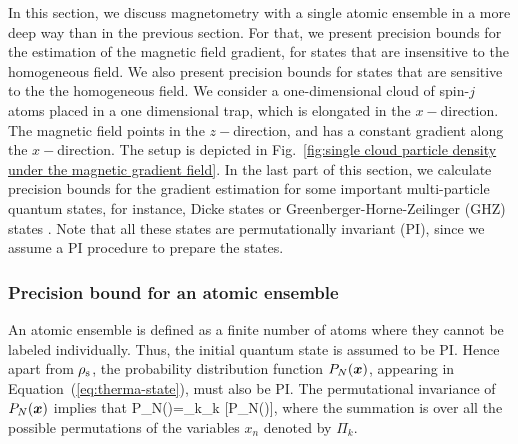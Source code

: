 In this section, we discuss magnetometry with a single
atomic ensemble in a more deep way than in the previous section.
For that, we present precision bounds for
the estimation of the magnetic field gradient, for
states that are insensitive to the homogeneous field.
We also present precision bounds for states that are sensitive to the
the homogeneous field.
We consider a one-dimensional cloud of spin-$j$ atoms
placed in a one dimensional trap, which is elongated
in the  $x-$direction.
The magnetic field points in the  $z-$direction,
and has a constant gradient along the $x-$direction.
The setup is depicted
in Fig.~\ref{fig:single cloud particle density under the magnetic gradient field}.
In the last part of this section, we calculate precision bounds for the
gradient estimation for some important multi-particle quantum states,
for instance, Dicke states or
Greenberger-Horne-Zeilinger (GHZ) states \cite{Greenberger1990}.
Note that all these states are permutationally invariant (PI), since we
assume a PI procedure to prepare the states.

\subsubsection{Precision bound for an atomic ensemble}

An atomic ensemble is defined as a finite number of atoms where
they cannot be labeled individually.
Thus, the initial quantum state is assumed to be PI.
Hence apart from $\rho_{\rm s}$, the probability distribution function
$P_N(\boldsymbol{x})$, appearing in Equation~(\ref{eq:therma-state}),
must also be PI.
The permutational invariance of $P_N(\boldsymbol{x})$ implies that
\be
\label{eq:pi-for-pdf}
P_N()=\sum_{k}\Pi_k [P_N()],
\ee
where the summation is over all the possible permutations
of the variables $x_n$ denoted by
$\Pi_k.$

